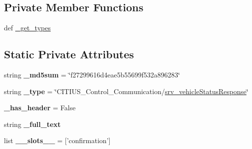 \subsection*{\-Private \-Member \-Functions}
\begin{DoxyCompactItemize}
\item 
def \hyperlink{class_c_i_t_i_u_s___control___communication_1_1srv_1_1__srv__vehicle_status_1_1srv__vehicle_status_response_abab4690307583f4d6f466044ee68c831}{\-\_\-get\-\_\-types}
\end{DoxyCompactItemize}
\subsection*{\-Static \-Private \-Attributes}
\begin{DoxyCompactItemize}
\item 
\hypertarget{class_c_i_t_i_u_s___control___communication_1_1srv_1_1__srv__vehicle_status_1_1srv__vehicle_status_response_a5914b63d4834a6c490efeba2d77567c4}{string {\bfseries \-\_\-md5sum} = \char`\"{}f27299616d4eae5b55699f532a896283\char`\"{}}\label{class_c_i_t_i_u_s___control___communication_1_1srv_1_1__srv__vehicle_status_1_1srv__vehicle_status_response_a5914b63d4834a6c490efeba2d77567c4}

\item 
\hypertarget{class_c_i_t_i_u_s___control___communication_1_1srv_1_1__srv__vehicle_status_1_1srv__vehicle_status_response_a23476487eeee4268296a9d0a54be5e5d}{string {\bfseries \-\_\-type} = \char`\"{}\-C\-I\-T\-I\-U\-S\-\_\-\-Control\-\_\-\-Communication/\hyperlink{class_c_i_t_i_u_s___control___communication_1_1srv_1_1__srv__vehicle_status_1_1srv__vehicle_status_response}{srv\-\_\-vehicle\-Status\-Response}\char`\"{}}\label{class_c_i_t_i_u_s___control___communication_1_1srv_1_1__srv__vehicle_status_1_1srv__vehicle_status_response_a23476487eeee4268296a9d0a54be5e5d}

\item 
\hypertarget{class_c_i_t_i_u_s___control___communication_1_1srv_1_1__srv__vehicle_status_1_1srv__vehicle_status_response_abe6626816f599b9032a47396c16a68e6}{{\bfseries \-\_\-has\-\_\-header} = \-False}\label{class_c_i_t_i_u_s___control___communication_1_1srv_1_1__srv__vehicle_status_1_1srv__vehicle_status_response_abe6626816f599b9032a47396c16a68e6}

\item 
string {\bfseries \-\_\-full\-\_\-text}
\item 
\hypertarget{class_c_i_t_i_u_s___control___communication_1_1srv_1_1__srv__vehicle_status_1_1srv__vehicle_status_response_a4b5668d8c739d8e6104a4c572bf3ebe7}{list {\bfseries \-\_\-\-\_\-slots\-\_\-\-\_\-} = \mbox{[}'confirmation'\mbox{]}}\label{class_c_i_t_i_u_s___control___communication_1_1srv_1_1__srv__vehicle_status_1_1srv__vehicle_status_response_a4b5668d8c739d8e6104a4c572bf3ebe7}


\end{DoxyCompactItemize}
